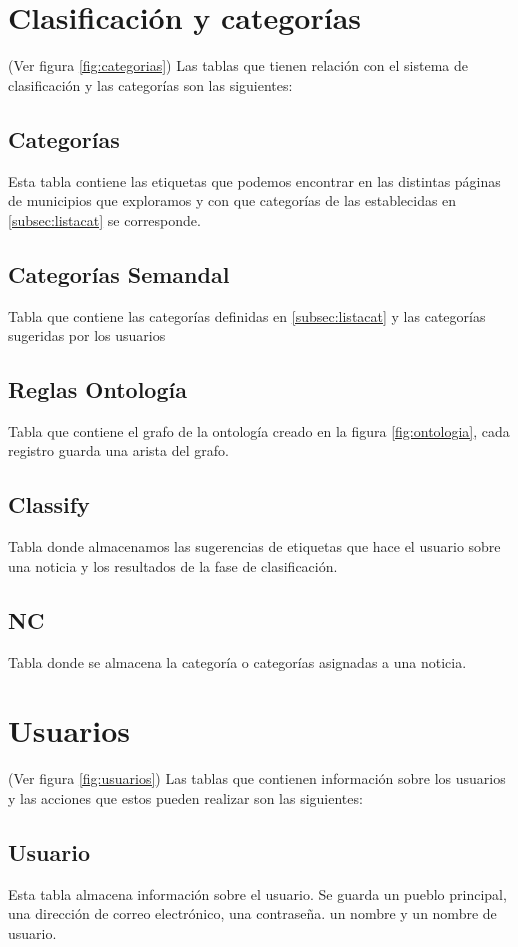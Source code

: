 \section{Clasificación y categorías}
(Ver figura \ref{fig:categorias})
Las tablas que tienen relación con el sistema de clasificación y las categorías son las siguientes:
\subsection{Categorías}
Esta tabla contiene las etiquetas que podemos encontrar en las distintas páginas de municipios que exploramos y con que categorías de las establecidas en \ref{subsec:listacat} se corresponde.
\subsection{Categorías Semandal}
Tabla que contiene las categorías definidas en \ref{subsec:listacat} y las categorías sugeridas por los usuarios
\subsection{Reglas Ontología}
Tabla que contiene el grafo de la ontología creado en la figura \ref{fig:ontologia}, cada registro guarda una arista del grafo.
\subsection{Classify}
Tabla donde almacenamos las sugerencias de etiquetas que hace el usuario sobre una noticia y los resultados de la fase de clasificación.
\subsection{NC}
Tabla donde se almacena la categoría o categorías asignadas a una noticia.

\section{Usuarios}
(Ver figura \ref{fig:usuarios}) Las tablas que contienen información sobre los usuarios y las acciones que estos pueden realizar son las siguientes:
\subsection{Usuario}
Esta tabla almacena información sobre el usuario. Se guarda un pueblo principal, una dirección de correo electrónico, una contraseña. un nombre y un nombre de usuario. 
